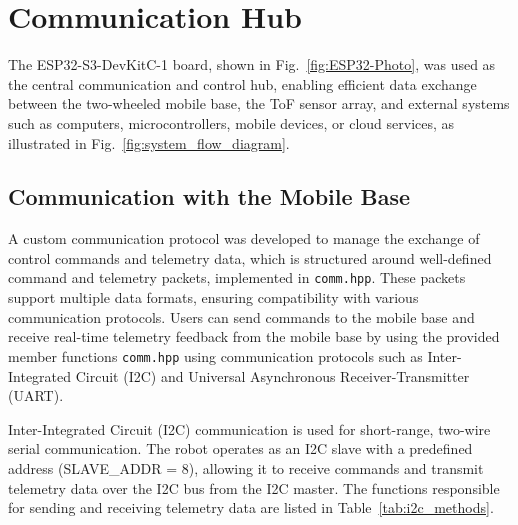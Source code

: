 \section{Communication Hub}
The ESP32-S3-DevKitC-1 board, shown in Fig.~\ref{fig:ESP32-Photo}, was used as the central communication and control hub, enabling efficient data exchange between the two-wheeled mobile base, the ToF sensor array, and external systems such as computers, microcontrollers, mobile devices, or cloud services, as illustrated in Fig.~\ref{fig:system_flow_diagram}.

\subsection{Communication with the Mobile Base}
A custom communication protocol was developed to manage the exchange of control commands and telemetry data, which is structured around well-defined command and telemetry packets, implemented in \texttt{comm.hpp}. These packets support multiple data formats, ensuring compatibility with various communication protocols. Users can send commands to the mobile base and receive real-time telemetry feedback from the mobile base by using the provided member functions \texttt{comm.hpp} using communication protocols such as Inter-Integrated Circuit (I2C) and Universal Asynchronous Receiver-Transmitter (UART).

Inter-Integrated Circuit (I2C) communication is used for short-range, two-wire serial communication. The robot operates as an I2C slave with a predefined address (SLAVE\_ADDR = 8), allowing it to receive commands and transmit telemetry data over the I2C bus from the I2C master. The functions responsible for sending and receiving telemetry data are listed in Table~\ref{tab:i2c_methods}.

